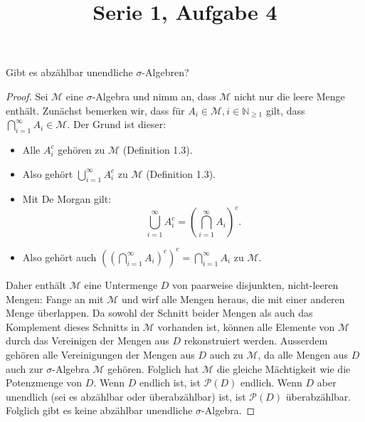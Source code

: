 \documentclass[11pt]{article}\usepackage[]{graphicx}\usepackage[]{color}
\title{Serie 1, Aufgabe 4}
\date{}
\newcommand{\N}{\mathbb{N}}
\begin{document}
\maketitle

Gibt es abzählbar unendliche $\sigma$-Algebren?

\begin{proof}
Sei $\mathcal{M}$ eine $\sigma$-Algebra und nimm an, dass $\mathcal{M}$ nicht nur die
leere Menge enthält.
Zunächst bemerken wir, dass für $A_i \in \mathcal{M}, i \in \N_{\geq 1}$ gilt, dass
$\bigcap_{i = 1}^{\infty} A_i \in \mathcal{M}$.
Der Grund ist dieser:
\begin{itemize}
  \item Alle $A^c_i$ gehören zu $\mathcal{M}$ (Definition 1.3).
  \item Also gehört $\bigcup_{i = 1}^{\infty} A^c_i$ zu $\mathcal{M}$ (Definition 1.3).
  \item Mit De Morgan gilt:
  \[\bigcup_{i = 1}^{\infty} A^c_i = \left(\bigcap_{i = 1}^{\infty} A_i\right)^c.\]
  \item Also gehört auch
  $\left(\left(\bigcap_{i = 1}^{\infty} A_i\right)^c\right)^c = \bigcap_{i = 1}^{\infty} A_i$ zu $\mathcal{M}$.
\end{itemize}
Daher enthält $\mathcal{M}$ eine Untermenge $D$ von paarweise disjunkten, nicht-leeren Mengen:
Fange an mit $\mathcal{M}$ und wirf alle Mengen heraus, die mit einer anderen Menge überlappen.
Da sowohl der Schnitt beider Mengen als auch das Komplement dieses Schnitts in $\mathcal{M}$
vorhanden ist, können alle Elemente von $\mathcal{M}$ durch das Vereinigen der Mengen aus $D$ rekonstruiert werden.
Ausserdem gehören alle Vereinigungen der Mengen aus $D$ auch zu $\mathcal{M}$, da alle Mengen
aus $D$ auch zur $\sigma$-Algebra $\mathcal{M}$ gehören.
Folglich hat $\mathcal{M}$ die gleiche Mächtigkeit wie die Potenzmenge von $D$.
Wenn $D$ endlich ist, ist $\mathcal{P}(D)$ endlich.
Wenn $D$ aber unendlich (sei es abzählbar oder überabzählbar) ist, ist $\mathcal{P}(D)$ überabzählbar.
Folglich gibt es keine abzählbar unendliche $\sigma$-Algebra.
\end{proof}
\end{document}
